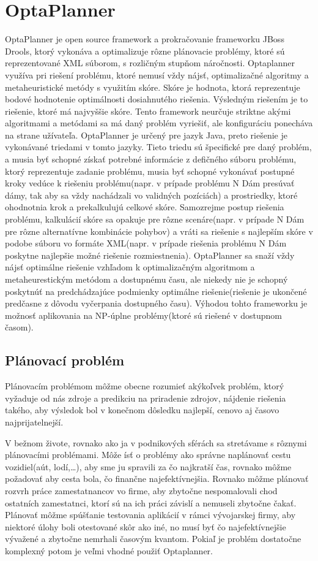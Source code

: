 \chapter{OptaPlanner}\label{optaplannerC}
OptaPlanner je open source framework a prokračovanie frameworku JBoss Drools, ktorý vykonáva a optimalizuje rôzne plánovacie problémy, ktoré sú reprezentované XML súborom, s rozličným stupňom náročnosti. Optaplanner využíva pri riešení problému, ktoré nemusí vždy nájsť, optimalizačné algoritmy a metaheuristické metódy s využitím skóre. Skóre je hodnota, ktorá reprezentuje bodové hodnotenie optimálnosti dosiahnutého riešenia. Výsledným riešením je to riešenie, ktoré má najvyššie skóre. Tento framework neurčuje striktne akými algoritmami a metódami sa má daný problém vyriešiť, ale konfiguráciu ponecháva na strane užívateľa. OptaPlanner je určený pre jazyk Java, preto riešenie je vykonávané triedami v tomto jazyky. Tieto triedu sú špecifické pre daný problém, a musia byť schopné získať potrebné informácie z defičného súboru problému, ktorý reprezentuje zadanie problému, musia byť schopné vykonávať postupné kroky vedúce k riešeniu problému(napr. v prípade problému N Dám presúvať dámy, tak aby sa vždy nachádzali vo validných pozíciách) a prostriedky, ktoré ohodnotnia krok a prekalkulujú celkové skóre. \newline \indent Samozrejme postup riešenia problému, kalkulácií skóre sa opakuje pre rôzne scenáre(napr. v prípade N Dám pre rôzne alternatívne kombinácie pohybov) a vráti sa riešenie s najlepším skóre v podobe súboru vo formáte XML(napr. v prípade riešenia problému N Dám poskytne najlepšie možné riešenie rozmiestnenia). OptaPlanner sa snaží vždy nájsť optimálne riešenie vzhľadom k optimalizačným algoritmom a metaheurestickým metódom a dostupnému času, ale niekedy nie je schopný poskytnúť na predchádzajúce podmienky optimálne riešenie(riešenie je ukončené predčasne z dôvodu vyčerpania dostupného času). Výhodou tohto frameworku je možnosť aplikovania na NP-úplne problémy(ktoré sú riešené v dostupnom časom). 

\section{Plánovací problém}\label{planprob}
Plánovacím problémom môžme obecne rozumieť akýkoľvek problém, ktorý vyžaduje od nás zdroje a predikciu na priradenie zdrojov, nájdenie riešenia takého, aby výsledok bol v konečnom dôsledku najlepší, cenovo aj časovo najprijatelnejší.

V bežnom živote, rovnako ako ja v podnikových sférách sa stretávame s rôznymi plánovacími problémami. Môže ísť o problémy ako správne naplánovať cestu vozidiel(aút, lodí,\ldots), aby sme ju spravili za čo najkratší čas, rovnako môžme požadovať aby cesta bola, čo finančne najefektívnejšia. Rovnako môžme plánovať rozvrh práce zamestatnancov vo firme, aby zbytočne nespomalovali chod ostatních zamestatnci, ktorí sú na ich práci závislí a nemuseli zbytočne čakať. Plánovať môžme spúšťanie testovania aplikácií v rámci vývojarskej firmy, aby niektoré úlohy boli otestované skôr ako iné, no musí byť čo najefektívnejšie vývažené a zbytočne nemrhali časovým kvantom. Pokiaľ je problém dostatočne komplexný potom je veľmi vhodné použiť Optaplanner. 

